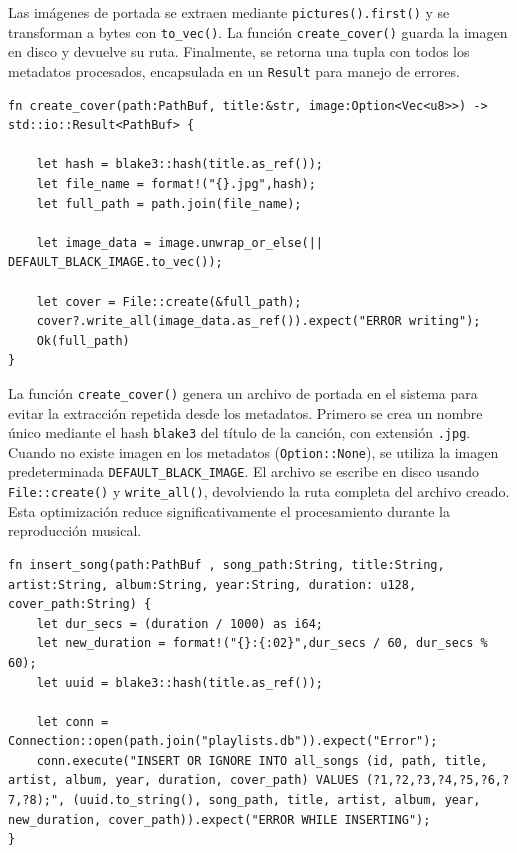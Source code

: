 \documentclass[11pt, a4paper]{article}
\begin{document}
            Las imágenes de portada se extraen mediante \texttt{pictures().first()} y se transforman a bytes con \texttt{to\_vec()}. La función \texttt{create\_cover()} guarda la imagen en disco y devuelve su ruta. Finalmente, se retorna una tupla con todos los metadatos procesados, encapsulada en un \texttt{Result} para manejo de errores.

            \newpage

            \begin{lstlisting}[caption={fn create\_cover()}]
fn create_cover(path:PathBuf, title:&str, image:Option<Vec<u8>>) -> std::io::Result<PathBuf> {

    let hash = blake3::hash(title.as_ref());
    let file_name = format!("{}.jpg",hash);
    let full_path = path.join(file_name);

    let image_data = image.unwrap_or_else(|| DEFAULT_BLACK_IMAGE.to_vec());

    let cover = File::create(&full_path);
    cover?.write_all(image_data.as_ref()).expect("ERROR writing");
    Ok(full_path)
}
            \end{lstlisting}

            La función \texttt{create\_cover()} genera un archivo de portada en el sistema para evitar la extracción repetida desde los metadatos. Primero se crea un nombre único mediante el hash \texttt{blake3} del título de la canción, con extensión \texttt{.jpg}. Cuando no existe imagen en los metadatos (\texttt{Option::None}), se utiliza la imagen predeterminada \texttt{DEFAULT\_BLACK\_IMAGE}. El archivo se escribe en disco usando \texttt{File::create()} y \texttt{write\_all()}, devolviendo la ruta completa del archivo creado. Esta optimización reduce significativamente el procesamiento durante la reproducción musical. \newpage

            \begin{lstlisting}[caption={fn insert\_song()}]
fn insert_song(path:PathBuf , song_path:String, title:String, artist:String, album:String, year:String, duration: u128, cover_path:String) {
    let dur_secs = (duration / 1000) as i64;
    let new_duration = format!("{}:{:02}",dur_secs / 60, dur_secs % 60);
    let uuid = blake3::hash(title.as_ref());

    let conn = Connection::open(path.join("playlists.db")).expect("Error");
    conn.execute("INSERT OR IGNORE INTO all_songs (id, path, title, artist, album, year, duration, cover_path) VALUES (?1,?2,?3,?4,?5,?6,?7,?8);", (uuid.to_string(), song_path, title, artist, album, year, new_duration, cover_path)).expect("ERROR WHILE INSERTING");
}
            \end{lstlisting}
\end{document}
